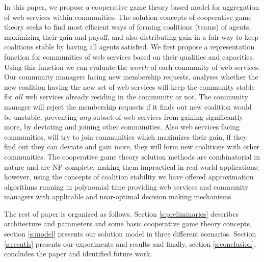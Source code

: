\documentclass[10pt, conference, compsocconf]{IEEEtran}
\theoremstyle{plain}
\theoremstyle{definition}
\begin{document}
In this paper, we propose a cooperative game theory based model for aggregation of web services within communities. The solution concepts of cooperative game theory seeks to find most efficient ways of forming coalitions (teams) of agents, maximizing their gain and payoff, and also distributing gain in a fair way to keep coalitions stable by having all agents satisfied. We first propose a representation function for communities of web services based on their qualities and capacities. Using this function we can evaluate the $worth$ of each community of web services. Our community managers facing new membership requests, analyses whether the new coalition having the new set of web services will keep the community stable for $all$ web services already residing in the community or not. The community manager will reject the membership requests if it finds out new coalition would be unstable, preventing $any$ subset of web services from gaining significantly more, by deviating and joining other communities. Also web services facing communities, will try to join communities which maximizes their gain, if they find out they can deviate and gain more, they will form new coalitions with other communities. The cooperative game theory solution methods are combinatorial in nature and are NP-complete, making them impractical in real world applications; however, using the concepts of coalition stability we have offered approximation algorithms running in polynomial time providing web services and community managers with applicable and near-optimal decision making mechanisms.

The rest of paper is organized as follows. Section \ref{s:preliminaries} describes architecture and parameters and some basic cooperative game theory concepts, section \ref{s:model} presents our solution model in three different scenarios. Section \ref{s:resutls} presents our experiments and results and finally, section \ref{s:conclusion}, concludes the paper and identified future work.



\end{document}

